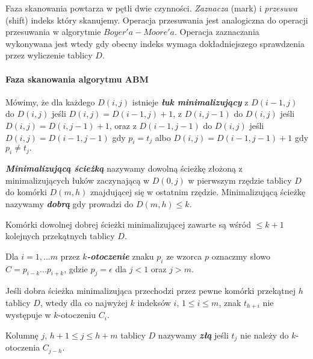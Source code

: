 Faza skanowania powtarza w pętli dwie czynności. \textit{Zaznacza} (mark) i \textit{przesuwa} (shift) indeks który skanujemy. Operacja przesuwania jest analogiczna do operacji przesuwania w algorytmie $Boyer'a-Moore'a$. Operacja zaznaczania wykonywana jest wtedy gdy obecny indeks wymaga dokładniejszego sprawdzenia przez wyliczenie tablicy $D.$

\paragraph{Faza skanowania algorytmu ABM}
\begin{definition}{}{}
    Mówimy, że dla każdego $D(i,j)$ istnieje {\bf \textit{łuk minimalizujący}} z $D(i-1, j)$ do $D(i, j)$ jeśli $D(i,j) = D(i - 1, j)+1$, z $D(i, j-1)$ do $D(i, j)$ jeśli $D(i,j) = D(i, j-1)+1$, oraz z $D(i-1,j-1)$ do $D(i, j)$ jeśli $D(i,j) = D(i-1, j-1)$ gdy $p_i = t_j$ albo 
    $D(i,j) = D(i-1, j-1) + 1$ gdy $p_i \neq t_j.$
\end{definition}
\begin{definition}{}{}
    {\bf \textit{Minimalizującą ścieżką}} nazywamy dowolną ścieżkę złożoną z minimalizujących łuków zaczynającą w $D(0,j)$ w pierwszym rzędzie tablicy $D$ do komórki $D(m, h)$ znajdującej się w ostatnim rzędzie. Minimalizującą ścieżkę nazywamy {\bf \textit{dobrą}} gdy prowadzi do $D(m, h) \leq k.$
\end{definition}
\begin{lemma}{}{}
    Komórki dowolnej dobrej ścieżki minimalizującej zawarte są wśród $\leq k+1$ kolejnych przekątnych tablicy $D.$
\end{lemma}
\begin{definition}{}{}
    Dla $i = 1,...m$ przez {\bf \textit{$k$-otoczenie}} znaku $p_i$ ze wzorca $p$ oznaczmy słowo $C = p_{i-k}...p_{i+k}$, gdzie $p_j = \epsilon$ dla $j < 1$ oraz $j > m.$
\end{definition}
\begin{lemma}{}{}
   Jeśli dobra ścieżka minimalizująca przechodzi przez pewne komórki przekątnej $h$ tablicy $D$, wtedy dla co najwyżej $k$ indeksów $i$, $1 \leq i \leq m$, znak $t_{h+i}$ nie występuje w $k$-otoczeniu $C_i.$
\end{lemma}

\begin{definition}{}{}
    Kolumnę $j$, $h+1 \leq j \leq h+m$ tablicy $D$ nazywamy {\bf \textit{złą}} jeśli $t_j$ nie należy do $k$-otoczenia $C_{j-h}.$
\end{definition}

